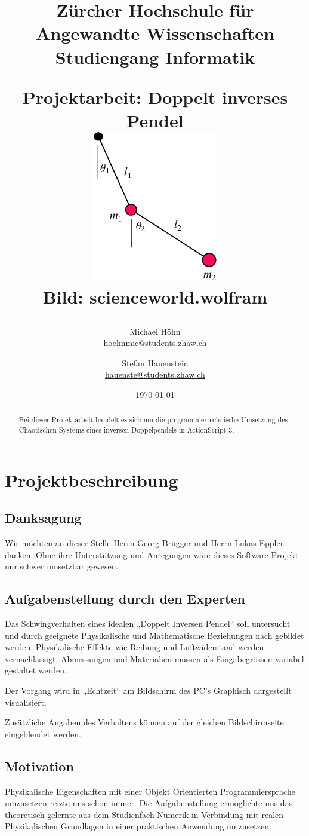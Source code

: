 \documentclass[12pt]{article}
\title{\vspace{-1cm}\linespread{1}\begin{flushleft}\normalsize{Zürcher Hochschule für Angewandte Wissenschaften\\Studiengang Informatik\\}\end{flushleft}\vspace{2cm}\Large{Projektarbeit: Doppelt inverses Pendel}\\\vspace{2cm} \includegraphics[scale=1]{title.png}\\\tiny{Bild: scienceworld.wolfram }}
\author{Michael Höhn\\\href{mailto:hoehnmic@students.zhaw.ch}{hoehnmic@students.zhaw.ch} \and Stefan Hauenstein\\\href{mailto:hauenste@students.zhaw.ch}{hauenste@students.zhaw.ch}}
\date{\today}
\numberwithin{equation}{subsection}
\begin{document}
\maketitle\thispagestyle{empty}

\newpage

\begin{abstract}
Bei dieser Projektarbeit handelt es sich um die programmiertechnische Umsetzung des Chaotischen Systems eines inversen Doppelpendels in ActionScript 3.
\end{abstract}
\newpage

\tableofcontents
\newpage

\section{Projektbeschreibung}
\subsection{Danksagung}
Wir möchten an dieser Stelle Herrn Georg Brügger und Herrn Lukas Eppler danken. Ohne ihre  Unterstützung und Anregungen wäre dieses Software Projekt nur schwer umsetzbar gewesen.

\subsection{Aufgabenstellung durch den Experten}
Das Schwingverhalten eines idealen „Doppelt Inversen Pendel“ soll untersucht und durch geeignete Physikalische und Mathematische Beziehungen nach gebildet werden. Physikalische Effekte wie Reibung und Luftwiderstand werden vernachlässigt, Abmessungen und Materialien müssen als Eingabegrössen variabel gestaltet werden.

Der Vorgang wird in „Echtzeit“ am Bildschirm des PC's Graphisch dargestellt visualisiert.

Zusätzliche Angaben des Verhaltens können auf der gleichen Bildschirmseite eingeblendet werden.

\subsection{Motivation}
Physikalische Eigenschaften mit einer Objekt Orientierten Programmiersprache umzusetzen reizte uns schon immer. Die  Aufgabenstellung ermöglichte uns das theoretisch gelernte aus dem Studienfach Numerik in Verbindung mit realen Physikalischen Grundlagen in einer praktischen Anwendung umzusetzen.
\end{document}
